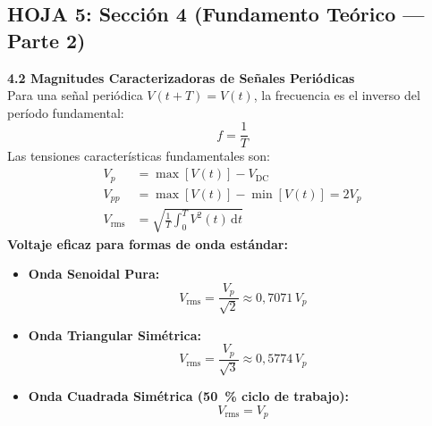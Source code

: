 \documentclass[a4paper, 11pt]{article}
\begin{document}
\newpage

\subsection*{\color{uni-blue} HOJA 5: Sección 4 (Fundamento Teórico --- Parte 2)}
\begin{tcolorbox}[title=Texto a Escribir: Sección 4 (Continuación), colframe=black]
    \small
    \textbf{4.2 Magnitudes Caracterizadoras de Señales Periódicas}\\[0.15cm]
    Para una señal periódica $V(t + T) = V(t)$, la frecuencia es el inverso del período fundamental:
    \begin{equation}
        f = \frac{1}{T} \tag{3}
    \end{equation}
    Las tensiones características fundamentales son:
    \begin{align}
        V_p &= \max[V(t)] - V_{\text{DC}} \tag{4} \\
        V_{pp} &= \max[V(t)] - \min[V(t)] = 2 V_p \tag{5} \\
        V_{\text{rms}} &= \sqrt{\frac{1}{T} \int_0^T V^2(t)\,\mathrm{d}t} \tag{6}
    \end{align}
    \textbf{Voltaje eficaz para formas de onda estándar:}
    \begin{itemize}[leftmargin=1.5em, itemsep=2pt]
        \item \textbf{Onda Senoidal Pura:}
        \begin{equation}
            V_{\text{rms}} = \frac{V_p}{\sqrt{2}} \approx 0{,}7071\,V_p \tag{7}
        \end{equation}
        \item \textbf{Onda Triangular Simétrica:}
        \begin{equation}
            V_{\text{rms}} = \frac{V_p}{\sqrt{3}} \approx 0{,}5774\,V_p \tag{8}
        \end{equation}
        \item \textbf{Onda Cuadrada Simétrica (\qty{50}{\percent} ciclo de trabajo):}
        \begin{equation}
            V_{\text{rms}} = V_p \tag{9}
        \end{equation}
    \end{itemize}
    

\end{tcolorbox}
\end{document}
